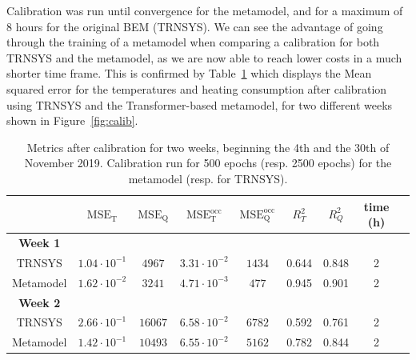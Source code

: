 \documentclass[12pt]{article}
\begin{document}
Calibration was run until convergence for the metamodel, and for a maximum of 8 hours for the original BEM (TRNSYS). We can see the advantage of going through the training of a metamodel when comparing a calibration for both TRNSYS and the metamodel, as we are now able to reach lower costs in a much shorter time frame. This is confirmed by Table~\ref{tab:calib} which displays the Mean squared error for the temperatures and heating consumption after calibration using TRNSYS and the Transformer-based metamodel, for two different weeks shown in Figure~\ref{fig:calib}.

\begin{table}
    \caption{Metrics after calibration for two weeks, beginning the 4th and the 30th of November 2019. Calibration run for 500 epochs (resp. 2500 epochs) for the metamodel (resp. for TRNSYS).}
    \label{tab:calib}
    \centering
    \begin{tabular}{*9c}    \toprule
                     & $\mathrm{MSE_T}$   & $\mathrm{MSE_Q}$ & $\mathrm{MSE_T^{occ}}$ & $\mathrm{MSE_Q^{occ}}$ & \emph{$R^2_T$} & \emph{$R^2_Q$} & time (h)   \\\toprule
        {\bf Week 1} &                    &                  &                        &                        &                &                &          & \\
        TRNSYS       & $1.04\cdot10^{-1}$ & $4967$           & $3.31\cdot10^{-2}$     & $1434$                 & 0.644          & 0.848          & 2          \\
        Metamodel    & $1.62\cdot10^{-2}$ & $3241$           & $4.71\cdot10^{-3}$     & $477$                  & 0.945          & 0.901          & 2          \\
        \midrule
        {\bf Week 2} &                    &                  &                        &                        &                &                &          & \\
        TRNSYS       & $2.66\cdot10^{-1}$ & $16067$          & $6.58\cdot10^{-2}$     & $6782$                 & 0.592          & 0.761          & 2          \\
        Metamodel    & $1.42\cdot10^{-1}$ & $10493$          & $6.55\cdot10^{-2}$     & $5162$                 & 0.782          & 0.844          & 2          \\
        \bottomrule
    \end{tabular}
\end{table}
\end{document}
